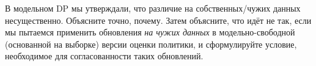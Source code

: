 \begin{exercise}
\label{ex:dp-on-off-policy}
В модельном DP мы утверждали, что различие на собственных/чужих данных несущественно.  Объясните точно, почему.  Затем объясните, что идёт не так, если мы пытаемся применить обновления \emph{на чужих данных} в модельно-свободной (основанной на выборке) версии оценки политики, и сформулируйте условие, необходимое для согласованности таких обновлений.
\end{exercise}
